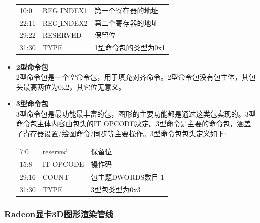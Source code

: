 \begin{itemize}
\begin{center}
\begin{supertabular}{p{2.cm}p{3.cm}m{10.cm}}
	10:0 & REG\underline{ }INDEX1 & 第一个寄存器的地址 \\
	22:11 & REG\underline{ }INDEX2 & 第二个寄存器的地址 \\
	29:22 & RESERVED & 保留位 \\
	31:30 & TYPE & 1型命令包的类型为0x1 \\
\end{supertabular}
\end{center}

\item{\textbf{2型命令包}} \\
2型命令包是一个空命令包，用于填充对齐命令。2型命令包没有包主体，其包头最高两位为0x2，其它位无意义。

\item{\textbf{3型命令包}} \\
3型命令包是最功能最丰富的包，图形的主要功能都是通过这类包实现的。3型命令包主体内容由包头的IT\underline{ }OPCODE决定。3型命令是主要的命令包，涵盖了寄存器设置/绘图命令/同步等主要操作。3型命令包包头定义如下:

\begin{center}  
\tablelasttail{\bottomrule}

\begin{supertabular}{p{2.cm}p{3.cm}m{10.cm}}
	7:0 & reserved & 保留位 \\
	15:8 & IT\underline{ }OPCODE & 操作码 \\
	29:16 & COUNT & 包主题DWORDS数目-1 \\
	31:30 & TYPE & 3型包类型为0x3 \\
\end{supertabular}
\end{center}

\end{itemize}

\subsubsection{Radeon显卡3D图形渲染管线}

